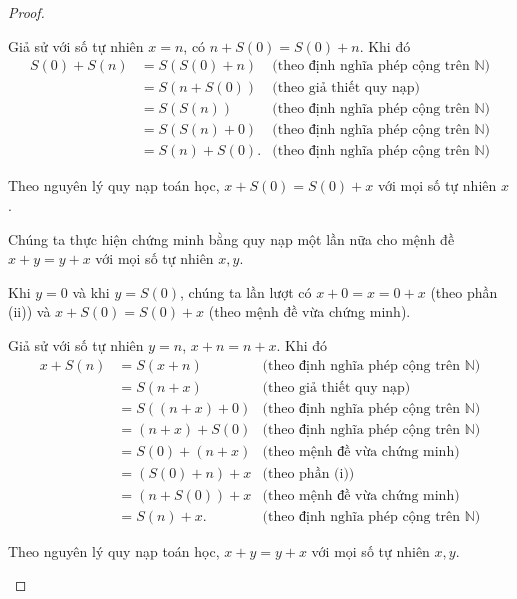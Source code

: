 \begin{proof}
\begin{enumerate}[label={(\roman*)}]
              Giả sử với số tự nhiên $x = n$, có $n + S(0) = S(0) + n$. Khi đó
              \begin{align*}
                  S(0) + S(n) & = S(S(0) + n)  & \text{(theo định nghĩa phép cộng trên $\mathbb{N}$)} \\
                              & = S(n + S(0))  & \text{(theo giả thiết quy nạp)}                      \\
                              & = S(S(n))      & \text{(theo định nghĩa phép cộng trên $\mathbb{N}$)} \\
                              & = S(S(n) + 0)  & \text{(theo định nghĩa phép cộng trên $\mathbb{N}$)} \\
                              & = S(n) + S(0). & \text{(theo định nghĩa phép cộng trên $\mathbb{N}$)}
              \end{align*}

              Theo nguyên lý quy nạp toán học, $x + S(0) = S(0) + x$ với mọi số tự nhiên $x$.

              Chúng ta thực hiện chứng minh bằng quy nạp một lần nữa cho mệnh đề $x + y = y + x$ với mọi số tự nhiên $x, y$.

              Khi $y = 0$ và khi $y = S(0)$, chúng ta lần lượt có $x + 0 = x = 0 + x$ (theo phần (ii)) và $x + S(0) = S(0) + x$ (theo mệnh đề vừa chứng minh).

              Giả sử với số tự nhiên $y = n$, $x + n = n + x$. Khi đó
              \begin{align*}
                  x + S(n) & = S(x + n)       & \text{(theo định nghĩa phép cộng trên $\mathbb{N}$)} \\
                           & = S(n + x)       & \text{(theo giả thiết quy nạp)}                      \\
                           & = S((n + x) + 0) & \text{(theo định nghĩa phép cộng trên $\mathbb{N}$)} \\
                           & = (n + x) + S(0) & \text{(theo định nghĩa phép cộng trên $\mathbb{N}$)} \\
                           & = S(0) + (n + x) & \text{(theo mệnh đề vừa chứng minh)}                 \\
                           & = (S(0) + n) + x & \text{(theo phần (i))}                               \\
                           & = (n + S(0)) + x & \text{(theo mệnh đề vừa chứng minh)}                 \\
                           & = S(n) + x.      & \text{(theo định nghĩa phép cộng trên $\mathbb{N}$)}
              \end{align*}

              Theo nguyên lý quy nạp toán học, $x + y = y + x$ với mọi số tự nhiên $x, y$.
    \end{enumerate}
\end{proof}

